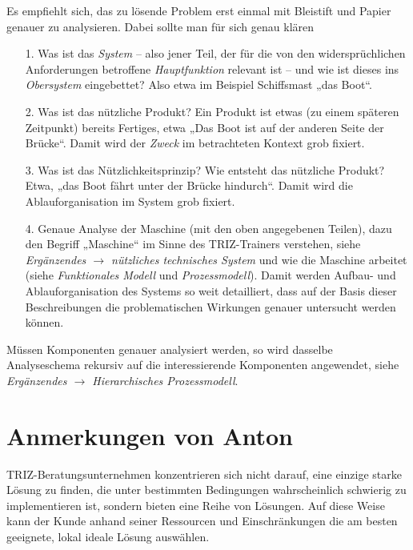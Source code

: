 \documentclass[11pt,a4paper]{article}
\begin{document}
Es empfiehlt sich, das zu lösende Problem erst einmal mit Bleistift und Papier
genauer zu analysieren. Dabei sollte man für sich genau klären
\begin{itemize}
\item[1.] Was ist das \emph{System} -- also jener Teil, der für die von den
  widersprüchlichen Anforderungen betroffene \emph{Hauptfunktion} relevant ist
  -- und wie ist dieses ins \emph{Obersystem} eingebettet? Also etwa im
  Beispiel Schiffsmast „das Boot“.

\item[2.] Was ist das nützliche Produkt? Ein Produkt ist etwas (zu einem
  späteren Zeitpunkt) bereits Fertiges, etwa „Das Boot ist auf der anderen
  Seite der Brücke“. Damit wird der \emph{Zweck} im betrachteten Kontext grob
  fixiert. 

\item[3.] Was ist das Nützlichkeitsprinzip? Wie entsteht das nützliche
  Produkt? Etwa, „das Boot fährt unter der Brücke hindurch“. Damit wird die
  Ablauforganisation im System grob fixiert. 

\item[4.] Genaue Analyse der Maschine (mit den oben angegebenen Teilen), dazu
  den Begriff „Maschine“ im Sinne des TRIZ-Trainers verstehen, siehe
  \emph{Ergänzendes $\to$ nützliches technisches System} und wie die Maschine
  arbeitet (siehe \emph{Funktionales Modell} und \emph{Prozessmodell}).  Damit
  werden Aufbau- und Ablauforganisation des Systems so weit detailliert, dass
  auf der Basis dieser Beschreibungen die problematischen Wirkungen genauer
  untersucht werden können. 
\end{itemize}
Müssen Komponenten genauer analysiert werden, so wird dasselbe Analyseschema
rekursiv auf die interessierende Komponenten angewendet, siehe
\emph{Ergänzendes $\to$ Hierarchisches Prozessmodell}.

\section{Anmerkungen von Anton}

TRIZ-Beratungsunternehmen konzentrieren sich nicht darauf, eine einzige starke
Lösung zu finden, die unter bestimmten Bedingungen wahrscheinlich schwierig zu
implementieren ist, sondern bieten eine Reihe von Lösungen. Auf diese Weise
kann der Kunde anhand seiner Ressourcen und Einschränkungen die am besten
geeignete, lokal ideale Lösung auswählen.
 
\end{document}
